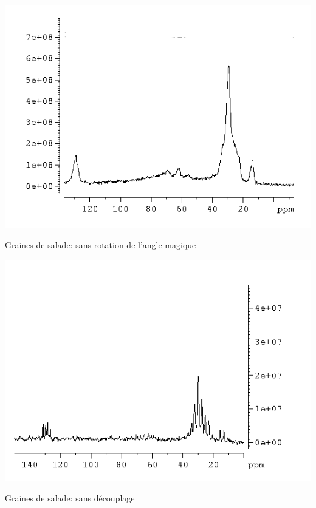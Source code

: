 \documentclass[a4paper,12pt]{scrartcl}
\begin{document}
 \begin{figurehere}
     \begin{minipage}{0.45\textwidth}
      \centering
     \includegraphics[width=\textwidth]{bilder/graine_sans_rot.png}   
     \caption{Graines de salade: sans rotation de l'angle magique}    
   \end{minipage}
   \hfill
   \begin{minipage}[H]{0.45\textwidth}
        \centering
       	\includegraphics[width=\textwidth]{bilder/graine_sans_decouplage.png}
        \caption{Graines de salade: sans découplage}
   \end{minipage}
    \end{figurehere}
\end{document}
